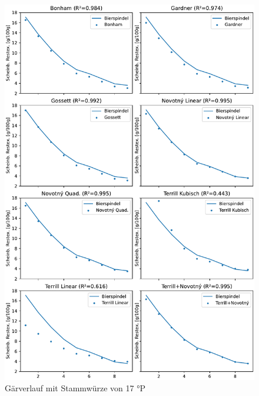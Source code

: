 \documentclass[a4paper,parskip=half]{scrartcl}
\begin{document}
\begin{figure}[H]
\centering
\includegraphics[width=14cm]{graph_fermentation.pdf}
\caption{Gärverlauf mit Stammwürze von 17 °P}
\label{fig:novotnygraph}
\end{figure}
\end{document}
